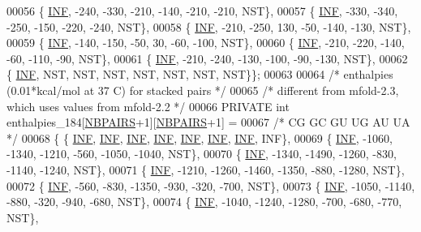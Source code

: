 \begin{DoxyCode}
00056   \{  \hyperlink{energy__const_8h_a12c2040f25d8e3a7b9e1c2024c618cb6}{INF},  -240,  -330,  -210,  -140,  -210,  -210, NST\},
00057   \{  \hyperlink{energy__const_8h_a12c2040f25d8e3a7b9e1c2024c618cb6}{INF},  -330,  -340,  -250,  -150,  -220,  -240, NST\},
00058   \{  \hyperlink{energy__const_8h_a12c2040f25d8e3a7b9e1c2024c618cb6}{INF},  -210,  -250,   130,   -50,  -140,  -130, NST\},
00059   \{  \hyperlink{energy__const_8h_a12c2040f25d8e3a7b9e1c2024c618cb6}{INF},  -140,  -150,   -50,    30,   -60,  -100, NST\},
00060   \{  \hyperlink{energy__const_8h_a12c2040f25d8e3a7b9e1c2024c618cb6}{INF},  -210,  -220,  -140,   -60,  -110,   -90, NST\},
00061   \{  \hyperlink{energy__const_8h_a12c2040f25d8e3a7b9e1c2024c618cb6}{INF},  -210,  -240,  -130,  -100,   -90,  -130, NST\},
00062   \{  \hyperlink{energy__const_8h_a12c2040f25d8e3a7b9e1c2024c618cb6}{INF},   NST,   NST,   NST,   NST,   NST,   NST, NST\}\};
00063 
00064 \textcolor{comment}{/* enthalpies (0.01*kcal/mol at 37 C) for stacked pairs */}
00065 \textcolor{comment}{/* different from mfold-2.3, which uses values from mfold-2.2 */}
00066 PRIVATE \textcolor{keywordtype}{int} enthalpies\_184[\hyperlink{energy__const_8h_a5e75221c779d618eab81e096f37e32ce}{NBPAIRS}+1][\hyperlink{energy__const_8h_a5e75221c779d618eab81e096f37e32ce}{NBPAIRS}+1] =
00067 \textcolor{comment}{/*          CG     GC     GU     UG     AU     UA  */}
00068 \{ \{  \hyperlink{energy__const_8h_a12c2040f25d8e3a7b9e1c2024c618cb6}{INF},   \hyperlink{energy__const_8h_a12c2040f25d8e3a7b9e1c2024c618cb6}{INF},   \hyperlink{energy__const_8h_a12c2040f25d8e3a7b9e1c2024c618cb6}{INF},   \hyperlink{energy__const_8h_a12c2040f25d8e3a7b9e1c2024c618cb6}{INF},   \hyperlink{energy__const_8h_a12c2040f25d8e3a7b9e1c2024c618cb6}{INF},   \hyperlink{energy__const_8h_a12c2040f25d8e3a7b9e1c2024c618cb6}{INF},   \hyperlink{energy__const_8h_a12c2040f25d8e3a7b9e1c2024c618cb6}{INF}, INF\},
00069   \{  \hyperlink{energy__const_8h_a12c2040f25d8e3a7b9e1c2024c618cb6}{INF}, -1060, -1340, -1210,  -560, -1050, -1040, NST\},
00070   \{  \hyperlink{energy__const_8h_a12c2040f25d8e3a7b9e1c2024c618cb6}{INF}, -1340, -1490, -1260,  -830, -1140, -1240, NST\},
00071   \{  \hyperlink{energy__const_8h_a12c2040f25d8e3a7b9e1c2024c618cb6}{INF}, -1210, -1260, -1460, -1350,  -880, -1280, NST\},
00072   \{  \hyperlink{energy__const_8h_a12c2040f25d8e3a7b9e1c2024c618cb6}{INF},  -560,  -830, -1350,  -930,  -320,  -700, NST\},
00073   \{  \hyperlink{energy__const_8h_a12c2040f25d8e3a7b9e1c2024c618cb6}{INF}, -1050, -1140,  -880,  -320,  -940,  -680, NST\},
00074   \{  \hyperlink{energy__const_8h_a12c2040f25d8e3a7b9e1c2024c618cb6}{INF}, -1040, -1240, -1280,  -700,  -680,  -770, NST\},

\end{DoxyCode}

